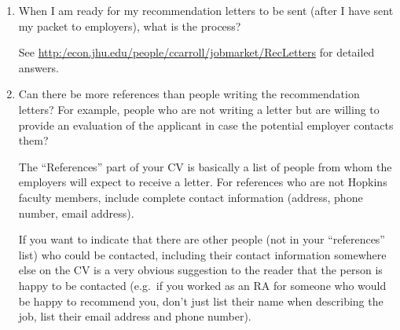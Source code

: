 \documentclass{econtex}
\begin{document}
\begin{enumerate}
      As I understand it, the Federal Reserve Banks can hire people from countries not in this list, but cannot give them ``Class 2'' clearance until they have served for two years, which means that the person cannot do much of what economists are hired at a Bank to do during that period.\footnote{For example, they cannot see the TealBook is the Fed's real-time assessment of economic conditions compiled before the FOMC meeting, and the preparation of which is a principal responsibility of economists at both the Board of Governors and at the Federal Reserve Banks.  It can never give them ``Class 1'' clearance, so such employees are limited in what they can do (which makes them much less attractive to the Fed).}  This means that the Banks only rarely hire persons from countries not on the list, and generally only when that person has some very unique skill or knowledge that cannot be obtained in any other way.

     As of the fall of 2017, it is my understanding that the Board and the Banks now sponsor people for Green cards after three years of employment.  (This seems to have changed over time, so if it is important to your job choice then you should verify it).

\item {} 
When I am ready for my recommendation letters to be sent (after I have
sent my packet to employers), what is the process?

See \url{http:/econ.jhu.edu/people/ccarroll/jobmarket/RecLetters} for detailed answers.


\item  Can there be more references than people writing the recommendation 
 letters? For example, people who are not writing a letter but are willing to provide 
 an evaluation of the applicant in case the potential employer contacts them?

 The ``References'' part of your CV is basically a list of people from
 whom the employers will expect to receive a letter.  For references who
 are not Hopkins faculty members, include complete contact information
 (address, phone number, email address).

 If you want to indicate that there are other people (not in your
 ``references'' list) who could be contacted, including their contact
 information somewhere else on the CV is a very obvious suggestion to
 the reader that the person is happy to be contacted (e.g.\ if you
 worked as an RA for someone who would be happy to recommend you,
 don't just list their name when describing the job, list their email
 address and phone number).



\end{enumerate}
\end{document}
